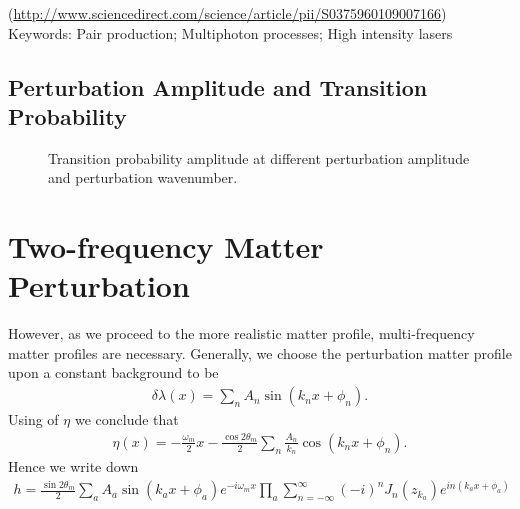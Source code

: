 \documentclass[letterpaper,12pt,english]{sphinxmanual}
\begin{document}
(\url{http://www.sciencedirect.com/science/article/pii/S0375960109007166})
Keywords: Pair production; Multiphoton processes; High intensity lasers


\subsection{Perturbation Amplitude and Transition Probability}
\label{\detokenize{matter-stimulated/single-frequency:perturbation-amplitude-and-transition-probability}}\begin{figure}[htbp]
\centering
\capstart

\noindent{}
\caption{Transition probability amplitude at different perturbation amplitude and perturbation wavenumber.}\label{\detokenize{matter-stimulated/single-frequency:id10}}\end{figure}


\section{Two-frequency Matter Perturbation}
\label{\detokenize{matter-stimulated/two-frequency:two-frequency-matter-perturbation}}\label{\detokenize{matter-stimulated/two-frequency::doc}}
However, as we proceed to the more realistic matter profile, multi-frequency matter profiles are necessary. Generally, we choose the perturbation matter profile upon a constant background to be
\begin{equation*}
\begin{split}\delta \lambda(x) = \sum_n A_n \sin (k_n x + \phi_n).\end{split}
\end{equation*}
Using {\hyperref[\detokenize{matter-stimulated/index:matter-stimulated-equation-eta-x-general}]{}} of \(\eta\) we conclude that
\begin{equation*}
\begin{split}\eta(x) = - \frac{\omega_m}{2}x - \frac{\cos 2\theta_m}{2} \sum_n \frac{A_n}{k_n} \cos ( k_n x+ \phi_n ).\end{split}
\end{equation*}
Hence we write down
\begin{equation*}
\begin{split}h = \frac{\sin 2\theta_m}{2} \sum_a A_a \sin (k_a x + \phi_a) e^{-i\omega_m x}\prod_{a} \sum_{n=-\infty}^{\infty} (-i)^n J_n (z_{k_a}) e^{i n(k_a x + \phi_a) }\end{split}
\end{equation*}
\end{document}

